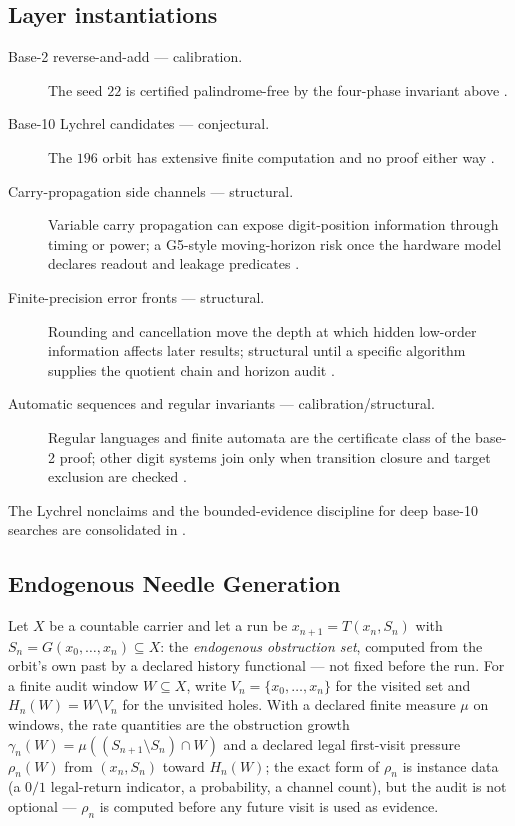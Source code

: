 \documentclass[11pt]{article}
\newcommand{\lawGSix}{Endogenous Needle Generation}
\theoremstyle{definition}
\begin{document}
\subsection*{Layer instantiations}\label{layer-inst:G5}
\begin{description}
  \item[Base-2 reverse-and-add --- calibration.] The seed $22$ is certified palindrome-free by the
    four-phase invariant above \citep{OEIS-A060382,Brown-MathPages}.
  \item[Base-10 Lychrel candidates --- conjectural.] The $196$ orbit has extensive finite computation
    and no proof either way \citep{Walker-Fourmilab}.
  \item[Carry-propagation side channels --- structural.] Variable carry propagation can expose
    digit-position information through timing or power; a G5-style moving-horizon risk once the
    hardware model declares readout and leakage predicates \citep{Kocher1996}.
  \item[Finite-precision error fronts --- structural.] Rounding and cancellation move the depth at
    which hidden low-order information affects later results; structural until a specific algorithm
    supplies the quotient chain and horizon audit \citep{Higham2002}.
  \item[Automatic sequences and regular invariants --- calibration/structural.] Regular languages and
    finite automata are the certificate class of the base-2 proof; other digit systems join only when
    transition closure and target exclusion are checked \citep{AlloucheShallit2003}.
\end{description}

The Lychrel nonclaims and the bounded-evidence discipline for deep base-10 searches are consolidated
in .

\subsection{\lawGSix}\label{sec:clusterB:g6}

Let $X$ be a countable carrier and let a run be $x_{n+1} = T(x_n, S_n)$ with
$S_n = G(x_0, \ldots, x_n) \subseteq X$: the \emph{endogenous obstruction set}, computed from the
orbit's own past by a declared history functional --- not fixed before the run. For a finite audit
window $W \subseteq X$, write $V_n = \{x_0, \ldots, x_n\}$ for the visited set and
$H_n(W) = W \setminus V_n$ for the unvisited holes. With a declared finite measure $\mu$ on windows,
the rate quantities are the obstruction growth $\gamma_n(W) = \mu((S_{n+1} \setminus S_n) \cap W)$
and a declared legal first-visit pressure $\rho_n(W)$ from $(x_n, S_n)$ toward $H_n(W)$; the exact
form of $\rho_n$ is instance data (a $0/1$ legal-return indicator, a probability, a channel count),
but the audit is not optional --- $\rho_n$ is computed before any future visit is used as evidence.
\end{document}
